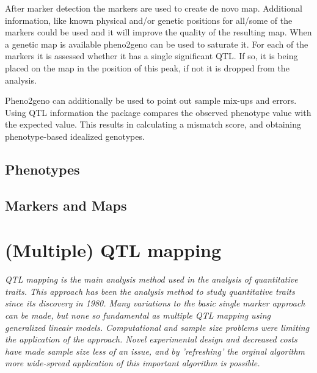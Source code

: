 \documentclass[8pt, twoside, a5paper]{report}
\begin{document}
After marker detection the markers are used to create de novo map. Additional information, like known physical 
and/or genetic positions for all/some of the markers could be used and it will improve the quality of the 
resulting map. When a genetic map is available pheno2geno can be used to saturate it. For each of the markers 
it is assessed whether it has a single significant QTL. If so, it is being placed on the map in the position 
of this peak, if not it is dropped from the analysis.

Pheno2geno can additionally be used to point out sample mix-ups and errors. Using QTL information the package 
compares the observed phenotype value with the expected value. This results in calculating a mismatch score, 
and obtaining phenotype-based idealized genotypes. 

\section{Phenotypes}
\lipsum

\section{Markers and Maps}
\lipsum

\chapter{(Multiple) QTL mapping}

\emph{QTL mapping is the main analysis method used in the analysis of quantitative traits. This approach has been 
the analysis method to study quantitative traits since its discovery in 1980. Many variations to the basic single 
marker approach can be made, but none so fundamental as multiple QTL mapping using generalized lineair models. 
Computational and sample size problems were limiting the application of the approach. Novel experimental 
design and decreased costs have made sample size less of an issue, and by 'refreshing' the orginal algorithm 
more wide-spread application of this important algorithm is possible.}
\null
\vfill
\end{document}
